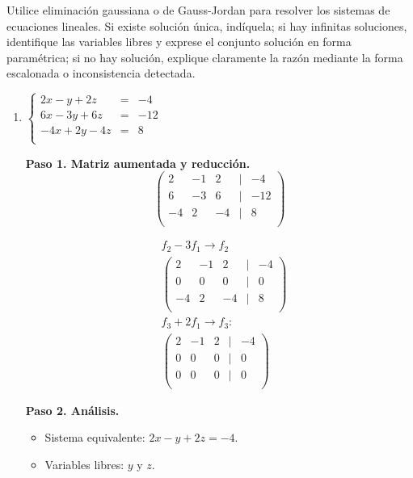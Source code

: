 \begin{prob} 
Utilice eliminación gaussiana o de Gauss-Jordan para resolver los sistemas de ecuaciones lineales. Si existe solución única, indíquela; si hay infinitas soluciones, identifique las variables libres y exprese el conjunto solución en forma paramétrica; si no hay solución, explique claramente la razón mediante la forma escalonada o inconsistencia detectada.

    \begin{enumerate}[$a)$]
    \item  $\left\lbrace \begin{array}{ccc}
2x-y+2z&=&-4\\
6x-3y+6z&=&-12\\
-4x+2y-4z&=&8\\
\end{array} \right. $ 
    
    \begin{myproof}
    \textbf{Paso 1. Matriz aumentada y reducción.}
    \[
    \begin{pmatrix}
    2 & -1 & 2 & | & -4 \\
    6 & -3 & 6 & | & -12 \\
    -4 & 2 & -4 & | & 8 \\
    \end{pmatrix}
    \]
    
    \begin{align*}
    &f_2 - 3f_1\to f_2 \\
    &\begin{pmatrix}
    2 & -1 & 2 & | & -4 \\
    0 & 0 & 0 & | & 0 \\
    -4 & 2 & -4 & | & 8 \\
    \end{pmatrix} \\
    &f_3 + 2f_1\to f_3: \\
    &\begin{pmatrix}
    2 & -1 & 2 & | & -4 \\
    0 & 0 & 0 & | & 0 \\
    0 & 0 & 0 & | & 0 \\
    \end{pmatrix}
    \end{align*}
    
    \textbf{Paso 2. Análisis.}
    \begin{itemize}
    \item Sistema equivalente: $2x - y + 2z = -4$.
    \item Variables libres: $y$ y $z$.
    \end{itemize}


\end{myproof}
\end{enumerate}
\end{prob}
